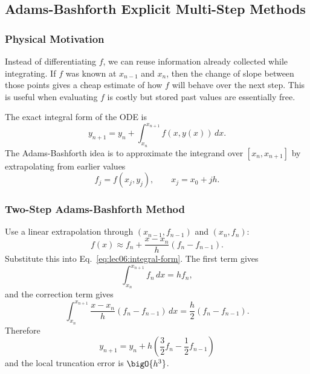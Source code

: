 \subsection{Adams-Bashforth Explicit Multi-Step Methods}
\label{subsec:lec06:adams-bashforth}

\subsubsection*{Physical Motivation}
Instead of differentiating $f$, we can reuse information already collected
while integrating. If $f$ was known at $x_{n-1}$ and $x_n$, then the change
of slope between those points gives a cheap estimate of how $f$ will behave
over the next step. This is useful when evaluating $f$ is costly but stored
past values are essentially free.

The exact integral form of the ODE is
\begin{equation}
    y_{n+1}
    = y_n+\int_{x_n}^{x_{n+1}} f(x,y(x))\,dx.
    \label{eq:lec06:integral-form}
\end{equation}
The Adams-Bashforth idea is to approximate the integrand over
$[x_n,x_{n+1}]$ by extrapolating from earlier values
\begin{equation}
    f_j=f(x_j,y_j),
    \qquad x_j=x_0+jh.
    \label{eq:lec06:fj-definition}
\end{equation}

\subsubsection{Two-Step Adams-Bashforth Method}
Use a linear extrapolation through $(x_{n-1},f_{n-1})$ and $(x_n,f_n)$:
\begin{equation}
    f(x)\approx f_n+\frac{x-x_n}{h}\left(f_n-f_{n-1}\right).
    \label{eq:lec06:linear-extrapolation}
\end{equation}
Substitute this into Eq.~\eqref{eq:lec06:integral-form}. The first term gives
\begin{equation}
    \int_{x_n}^{x_{n+1}} f_n\,dx=h f_n,
    \label{eq:lec06:ab2-integral-first}
\end{equation}
and the correction term gives
\begin{equation}
    \int_{x_n}^{x_{n+1}}
    \frac{x-x_n}{h}\left(f_n-f_{n-1}\right)\,dx
    =\frac{h}{2}\left(f_n-f_{n-1}\right).
    \label{eq:lec06:ab2-integral-second}
\end{equation}
Therefore
\begin{equation}
    \boxed{
    y_{n+1}
    = y_n+h\left(\frac{3}{2}f_n-\frac{1}{2}f_{n-1}\right)}
    \label{eq:lec06:ab2}
\end{equation}
and the local truncation error is $\bigO{h^3}$.

